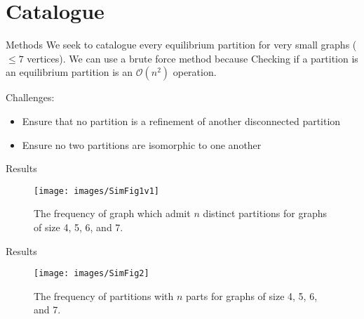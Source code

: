 \documentclass{beamer}
\begin{document}
\section{Catalogue}
\begin{frame}{Methods}
	We seek to catalogue every equilibrium partition for very small graphs ($\leq 7$ vertices). We can use a brute force method because Checking if a partition is an equilibrium partition is an $\mathcal{O}(n^2)$ operation. 
	
	Challenges:
	\begin{itemize}
		\item Ensure that no partition is a refinement of another disconnected partition
		\item Ensure no two partitions are isomorphic to one another
	\end{itemize}
\end{frame}


\begin{frame}{Results}
	\begin{figure}
		\texttt{[image: images/SimFig1v1]}
		\caption{The frequency of graph which admit $n$ distinct partitions for graphs of size 4, 5, 6, and 7. }
	\end{figure}
	
\end{frame}

\begin{frame}{Results}
	\begin{figure}
		\texttt{[image: images/SimFig2]}
		\caption{The frequency of partitions with $n$ parts for graphs of size 4, 5, 6, and 7. }
	\end{figure}
	
\end{frame}
\end{document}
